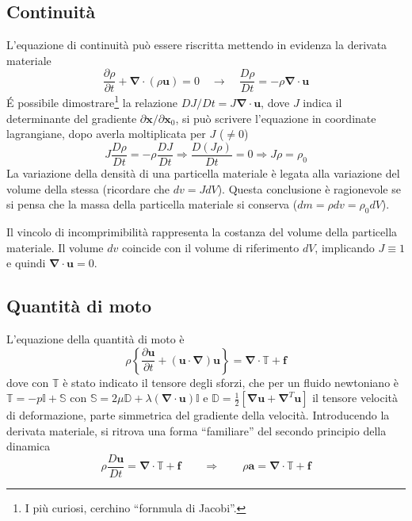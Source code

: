 

\subsection{Continuità}
%
L'equazione di continuità può essere riscritta mettendo in evidenza la derivata materiale
\begin{equation}
 \frac{\partial \rho}{\partial t} + \bm{\nabla} \cdot (\rho \bm{u}) = 0 
  \quad  \rightarrow  \quad 
  \frac{D\rho}{Dt} = -\rho \bm{\nabla} \cdot \bm{u}
\end{equation}
%
\'E possibile dimostrare\footnote{I più curiosi, cerchino ``fornmula di Jacobi''.} la relazione $DJ/Dt = J \bm{\nabla} \cdot \bm{u}$, dove
 $J$ indica il determinante del gradiente $\partial \bm{x}/\partial 
 \bm{x}_0$, si può scrivere l'equazione in coordinate lagrangiane,
 dopo averla moltiplicata per $J$ ($\ne 0$)
\begin{equation}
 J \frac{D\rho}{Dt} = - \rho \frac{DJ}{Dt} \Rightarrow
 \frac{D (J\rho)}{Dt} = 0 \Rightarrow J \rho = \rho_0
\end{equation}
%
La variazione della densità di una particella
 materiale è legata alla variazione del volume della stessa (ricordare
 che $dv = J dV$). Questa conclusione è ragionevole se si pensa che
 la massa della particella materiale si conserva ($dm = \rho dv = 
 \rho_0 dV$).
%
\begin{remark}
Il vincolo di incomprimibilità rappresenta la costanza del volume della 
 particella materiale. Il volume $dv$ coincide con il volume di riferimento $dV$, implicando $J \equiv 1$ e quindi  $\bm{\nabla} \cdot \bm{u} = 0$.
\end{remark}

\subsection{Quantità di moto}

L'equazione della quantità di moto è
\begin{equation}
 \rho \left\{ \frac{\partial \bm{u}}{\partial t} +
   \left( \bm{u} \cdot \bm{\nabla} \right) \bm{u} \right\} = 
   \bm{\nabla} \cdot \mathbb{T} + \bm{f}
\end{equation}
dove con $\mathbb{T}$ è stato indicato il tensore degli sforzi,
 che per un fluido newtoniano è $\mathbb{T} = -p \mathbb{I} + \mathbb{S}$
 con $\mathbb{S} = 2 \mu \mathbb{D} + \lambda \left( 
 \bm{\nabla} \cdot \bm{u} \right) \mathbb{I}$ e $\mathbb{D} = \frac{1}{2}
 \left[ \bm{\nabla}\bm{u} + \bm{\nabla}^T \bm{u} \right]$ il tensore
 velocità di deformazione, parte simmetrica del gradiente della velocità.
%
Introducendo la derivata materiale, si ritrova una forma ``familiare''
 del secondo principio della dinamica
\begin{equation}
 \rho\frac{D\bm{u}}{D t} = \bm{\nabla} \cdot \mathbb{T} + \bm{f}
  \qquad \Rightarrow \qquad
 \rho\bm{a} = \bm{\nabla} \cdot \mathbb{T} + \bm{f}
\end{equation}
%
